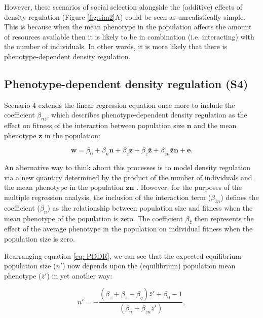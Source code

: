 \documentclass{article}
\begin{document}
However, these scenarios of social selection alongside the (additive) effects of density regulation (Figure \ref{fig:sim2}A) could be seen as unrealistically simple. This is because when the mean phenotype in the population affects the amount of resources available then it is likely to be in combination (i.e. interacting) with the number of individuals. In other words, it is more likely that there is phenotype-dependent density regulation. 

\subsection{Phenotype-dependent density regulation (S4)}

Scenario 4 extends the linear regression equation once more to include the coefficient $\beta_{n \bar{z}}$, which describes phenotype-dependent density regulation as the effect on fitness of the interaction between population size $\mathbf{n}$ and the mean phenotype $\bar{\mathbf{z}}$ in the population: 

\begin{equation} \label{eq: PDDR}
\mathbf{w}=\beta_{0} +\beta_{n} \mathbf{n} + \beta_{z} \mathbf{z}+ \beta_{\bar{z}} \bar{\mathbf{z}} + \beta_{\bar{z}n} \bar{\mathbf{z}} \mathbf{n}  +  \mathbf{e}.
\end{equation}

An alternative way to think about this processes is to model density regulation via a new quantity determined by the product of the number of individuals and the mean phenotype in the population $\bar{\mathbf{z}}\mathbf{n}$ \citep{Engen2020}. However, for the purposes of the multiple regression analysis, the inclusion of the interaction term ($\beta_{\bar{z}n}$) defines the coefficient ($\beta_{n}$) as the relationship between population size and fitness when the mean phenotype of the population is zero. The coefficient $ \beta_{\bar{z}}$ then represents the effect of the average phenotype in the population on individual fitness when the population size is zero. 

Rearranging equation \ref{eq: PDDR}, we can see that the expected equilibrium population size ($n'$) now depends upon the (equilibrium) population mean phenotype ($\bar{z}'$) in yet another way:

\begin{equation}
n' = -\frac{(\beta_{z}  + \beta_{\bar{z}} + \beta_{q})\bar{z}'+\beta_{0} -1}{(\beta_{n} +  \beta_{\bar{z}n} \bar{z}')},
\end{equation}
\end{document}
